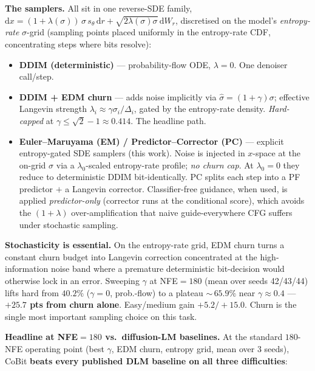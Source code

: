\documentclass[10pt]{article}
\newcommand{\best}[1]{\textbf{\color{cobit}#1}}
\begin{document}
\textbf{The samplers.} All sit in one reverse-SDE family,
$\mathrm{d}x=(1+\lambda(\sigma))\,\sigma\,s_\theta\,\mathrm{d}r+\sqrt{2\lambda(\sigma)\sigma}\,\mathrm{d}W_r$,
discretised on the model's \emph{entropy-rate} $\sigma$-grid (sampling points placed uniformly
in the entropy-rate CDF, concentrating steps where bits resolve):
\begin{itemize}\setlength\itemsep{0pt}
\item \textbf{DDIM (deterministic)} --- probability-flow ODE, $\lambda{=}0$. One denoiser call/step.
\item \textbf{DDIM + EDM churn} --- adds noise implicitly via $\hat\sigma=(1{+}\gamma)\sigma$;
effective Langevin strength $\lambda_i\approx\gamma\sigma_i/\Delta_i$, gated by the entropy-rate
density. \emph{Hard-capped} at $\gamma\le\sqrt2-1\approx0.414$. The headline path.
\item \textbf{Euler--Maruyama (EM) / Predictor--Corrector (PC)} --- explicit entropy-gated SDE
samplers (this work). Noise is injected in $x$-space at the on-grid $\sigma$ via a
$\lambda_0$-scaled entropy-rate profile; \emph{no churn cap}. At $\lambda_0{=}0$ they reduce to
deterministic DDIM bit-identically. PC splits each step into a PF predictor $+$ a Langevin
corrector. Classifier-free guidance, when used, is applied \emph{predictor-only} (corrector runs
at the conditional score), which avoids the $(1{+}\lambda)$ over-amplification that naive
guide-everywhere CFG suffers under stochastic sampling.
\end{itemize}

\textbf{Stochasticity is essential.} On the entropy-rate grid, EDM churn turns a constant churn
budget into Langevin correction concentrated at the high-information noise band where a premature
deterministic bit-decision would otherwise lock in an error. Sweeping $\gamma$ at NFE${=}180$
(mean over seeds 42/43/44) lifts hard from $40.2\%$ ($\gamma{=}0$, prob.-flow) to a plateau
$\sim$\,$65.9\%$ near $\gamma{\approx}0.4$ --- \best{$+25.7$ pts from churn alone}. Easy/medium
gain $+5.2/+15.0$. Churn is the single most important sampling choice on this task.

\textbf{Headline at NFE${=}180$ vs.\ diffusion-LM baselines.} At the standard $180$-NFE operating
point (best $\gamma$, EDM churn, entropy grid, mean over 3 seeds), CoBit
\best{beats every published DLM baseline on all three difficulties}:
\end{document}
